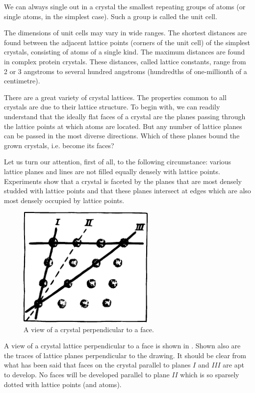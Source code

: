 We can always single out in a crystal the smallest repeating groups of atoms (or single atoms, in the simplest case). Such a group is called the unit cell. \label{unit-cell-def}

The dimensions of unit cells may vary in wide ranges. The shortest distances are found between the adjacent lattice points (corners of the unit cell) of the simplest crystals, consisting of atoms of a single kind. The maximum distances are found in complex protein crystals. These distances, called lattice constants, range from 2 or 3 angstroms to several hundred angstroms (hund­redths of one-millionth of a centimetre).

There are a great variety of crystal lattices. The prop­erties common to all crystals are due to their lattice structure. To begin with, we can readily understand that the ideally flat faces of a crystal are the planes passing through the lattice points at which atoms are located. But any number of lattice planes can be passed in the most diverse directions. Which of these planes bound the grown crystals, i.e. become its faces?

Let us turn our attention, first of all, to the following circumstance: various lattice planes and lines are not filled equally densely with lattice points. Experiments show that a crystal is faceted by the planes that are most densely studded with lattice points and that these planes intersect at edges which are also most densely occupied by lattice points.

\begin{figure}[!ht]
\centering
\includegraphics[width=0.6\textwidth]{figures/fig-02-14.pdf}
\caption{A view of a crystal perpendicular to a face.}
\label{fig-2.14}
\end{figure}

A view of a crystal lattice perpendicular to a face is shown in . Shown also are the traces of lattice planes perpendicular to the drawing. It should be clear from what has been said that faces on the crystal parallel to planes $I$ and $III$ are apt to develop. No faces will be developed parallel to plane $II$ which is so sparsely dotted with lattice points (and atoms).

